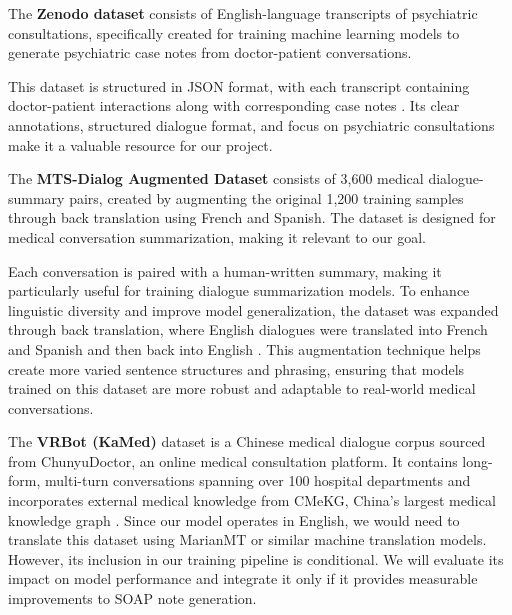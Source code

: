 \documentclass[11pt,a4paper]{article}
\begin{document}
The \textbf{Zenodo dataset} consists of English-language transcripts of psychiatric consultations, specifically created for training machine learning models to generate psychiatric case notes from doctor-patient conversations.\cite{kazi2020dataset}

This dataset is structured in JSON format, with each transcript containing doctor-patient interactions along with corresponding case notes \cite{kazi2020dataset}. Its clear annotations, structured dialogue format, and focus on psychiatric consultations make it a valuable resource for our project.

The \textbf{MTS-Dialog Augmented Dataset} consists of 3,600 medical dialogue-summary pairs, created by augmenting the original 1,200 training samples through back translation using French and Spanish. The dataset is designed for medical conversation summarization, making it relevant to our goal. \cite{mts-dialog}

Each conversation is paired with a human-written summary, making it particularly useful for training dialogue summarization models. To enhance linguistic diversity and improve model generalization, the dataset was expanded through back translation, where English dialogues were translated into French and Spanish and then back into English \cite{mts-dialog}. This augmentation technique helps create more varied sentence structures and phrasing, ensuring that models trained on this dataset are more robust and adaptable to real-world medical conversations.

The \textbf{VRBot (KaMed)} dataset is a Chinese medical dialogue corpus sourced from ChunyuDoctor, an online medical consultation platform. It contains long-form, multi-turn conversations spanning over 100 hospital departments and incorporates external medical knowledge from CMeKG, China’s largest medical knowledge graph \cite{li2021semi}. Since our model operates in English, we would need to translate this dataset using MarianMT or similar machine translation models. However, its inclusion in our training pipeline is conditional. We will evaluate its impact on model performance and integrate it only if it provides measurable improvements to SOAP note generation.
\end{document}
